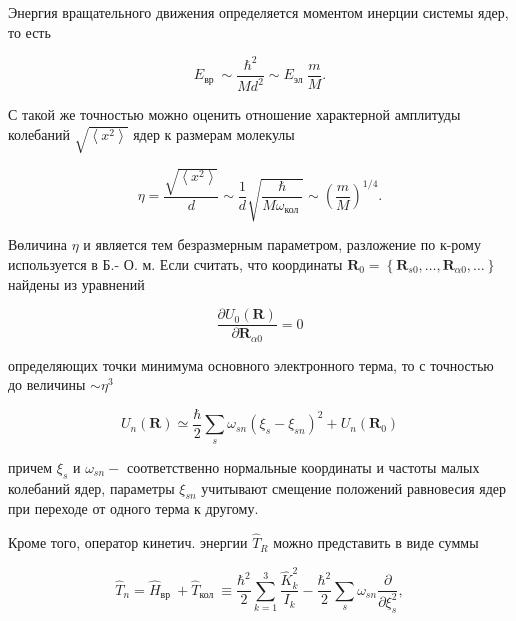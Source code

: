 \documentclass[10pt]{article}
\begin{document}
Энергия вращательного движения определяется моментом инерции системы ядер, то есть



\[

E_{\text {вр }} \sim \frac{\hbar^{2}}{M d^{2}} \sim E_{\text {эл }} \frac{m}{M} .

\]



С такой же точностью можно оценить отношение характерной амплитуды колебаний $\sqrt{\left\langle x^{2}\right\rangle}$ ядер к размерам молекулы



\[

\eta=\frac{\sqrt{\left\langle x^{2}\right\rangle}}{d} \sim \frac{1}{d} \sqrt{\frac{\hbar}{M \omega_{\text {кол }}}} \sim\left(\frac{m}{M}\right)^{1 / 4} .

\]



Вөличина $\eta$ и является тем безразмерным параметром, разложение по к-рому используется в Б.- О. м. Если считать, что координаты $\boldsymbol{R}_{0}=\left\{\boldsymbol{R}_{s 0}, \ldots, \boldsymbol{R}_{\alpha 0}, \ldots\right\}$ найдены из уравнений



\[

\frac{\partial U_{0}(\boldsymbol{R})}{\partial \boldsymbol{R}_{\alpha 0}}=0

\]



определяющих точки минимума основного электронного терма, то с точностью до величины $\sim \eta^{3}$



\[

U_{n}(\boldsymbol{R}) \simeq \frac{\hbar}{2} \sum_{s} \omega_{s n}\left(\xi_{s}-\xi_{s n}\right)^{2}+U_{n}\left(\boldsymbol{R}_{0}\right)

\]



причем $\xi_{s}$ и $\omega_{s n}-$ соответственно нормальные координаты и частоты малых колебаний ядер, параметры $\xi_{s n}$ учитывают смещение положений равновесия ядер при переходе от одного терма к другому.



Кроме того, оператор кинетич. энергии $\hat{T}_{R}$ можно представить в виде суммы



\[

\hat{T}_{n}=\hat{H}_{\text {вр }}+\hat{T}_{\text {кол }} \equiv \frac{\hbar^{2}}{2} \sum_{k=1}^{3} \frac{\hat{K}_{k}^{2}}{I_{k}}-\frac{\hbar^{2}}{2} \sum_{s} \omega_{s n} \frac{\partial}{\partial \xi_{s}^{2}},

\]
\end{document}
